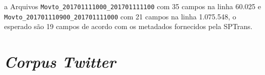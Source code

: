 \documentclass[
	12pt,				%
	oneside,			%
	a4paper,			%
	english,			%
	brazil				%
	]{abntex2ppgsi}
\begin{document}
{{\begin{table}[!htb]
\begin{threeparttable}
\begin{tablenotes}
\item[a] Arquivos  \texttt{Movto\_201701111000\_201701111100} com 35 campos na linha 60.025 e \texttt{Movto\_201701110900\_201701111000} com 21 campos na linha 1.075.548, o esperado são 19 campos de acordo com os metadados fornecidos pela SPTrans.
\end{tablenotes}
\end{threeparttable}
\end{table}


\clearpage
 
\section{\textit{Corpus Twitter}}


}}
\end{document}
